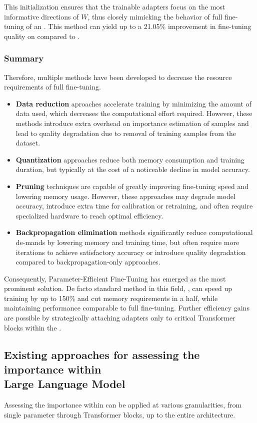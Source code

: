         This initialization ensures that the trainable adapters focus on the most informative directions of \(W\), thus closely mimicking the behavior of full fine-tuning of an \llm{} \cite{Demidovskij2024}. This method can yield up to a 21.05\% improvement in fine-tuning quality on \llamaTwoSmall{} compared to \lora{}.

    \subsubsection{Summary}
        Therefore, multiple methods have been developed to decrease the resource requirements of full fine-tuning.
        \begin{itemize}
            \item \textbf{Data reduction} aproaches accelerate training by minimizing the amount of data used, which decreases the computational effort required. However, these methods introduce extra overhead on importance estimation of samples  and lead to quality degradation due to removal of training samples from the dataset.
            \item \textbf{Quantization}  approaches reduce both memory consumption and training duration, but typically at the cost of a noticeable decline in model accuracy.
            \item  \textbf{Pruning} techniques are capable of greatly improving fine-tuning speed and lowering memory usage. However, these approaches may degrade model accuracy, introduce extra time for calibration or retraining, and often require specialized hardware to reach optimal efficiency.
            \item \textbf{Backpropagation elimination} methods significantly reduce computational de-mands by lowering memory and training time, but often require more iterations to achieve satisfactory accuracy or introduce quality degradation compared to backpropagation-only approaches.
        \end{itemize}

        Consequently, Parameter-Efficient Fine-Tuning has emerged as the most prominent solution. De facto standard method in this field, \lora{}, can speed up training by up to 150\% and cut memory requirements in a half, while maintaining performance comparable to full fine-tuning. Further efficiency gains are possible by strategically attaching adapters only to critical Transformer blocks within the \llm{}.

\subsection{Existing approaches for assessing the importance  within \\ Large Language Model}
    Assessing the importance within \llms{} can be applied at various granularities, from single parameter through Transformer blocks, up to the entire architecture.
